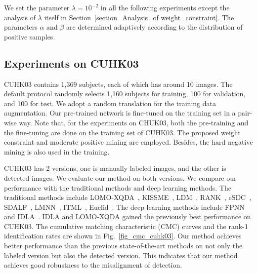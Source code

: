 \documentclass[10pt,twocolumn,letterpaper]{article}
\begin{document}
We set the parameter $\lambda = 10^{-2}$ in all the following experiments except the analysis of $\lambda$ itself in Section~\ref{section_Analysis_of weight_constraint}.
The parameters $\alpha$ and $\beta$ are determined adaptively according to the distribution of positive samples.

\subsection{Experiments on CUHK03}
\label{section_Experiments_on_CUHK03}

CUHK03 contains 1,369 subjects, each of which has around 10 images.
The default protocol randomly selects 1,160 subjects for training, 100 for validation, and 100 for test.
We adopt a random translation for the training data augmentation.
Our pre-trained network is fine-tuned on the training set in a pair-wise way.
Note that, for the experiments on CHUK03, both the pre-training and the fine-tuning are done on the training set of CUHK03.
The proposed weight constraint and moderate positive mining are employed. Besides, the hard negative mining is also used in the training.

\begin{figure*}[!htbp]
  \centering

  \caption{CMC curves and rank-1 identification rates on the CHUK03 data set. Our method outperforms the previous methods on both labeled (a) and detected (b) versions.}
  \label{fig_cmc_cuhk03}
\end{figure*}


CUHK03 has 2 versions, one is manually labeled images, and the other is detected images. We evaluate our method on both versions.
We compare our performance with the traditional methods and deep learning methods. The traditional methods include LOMO-XQDA~\cite{liao2015person}, KISSME~\cite{koestinger2012large}, LDM~\cite{guillaumin2009you}, RANK~\cite{mcfee2010metric}, eSDC~\cite{zhao2013unsupervised}, SDALF~\cite{farenzena2010person}, LMNN~\cite{weinberger2005distance}, ITML~\cite{davis2007information}, Euclid~\cite{zhao2013unsupervised}. The deep learning methods include FPNN~\cite{li2014deepreid} and IDLA~\cite{ahmed2015improved}. IDLA and LOMO-XQDA gained the previously best performance on CUHK03.
The cumulative matching characteristic (CMC) curves and the rank-1 identification rates are shown in Fig.~\ref{fig_cmc_cuhk03}.
Our method achieves better performance than the previous state-of-the-art methods on not only the labeled version but also the detected version.
This indicates that our method achieves good robustness to the misalignment of detection.
\end{document}
